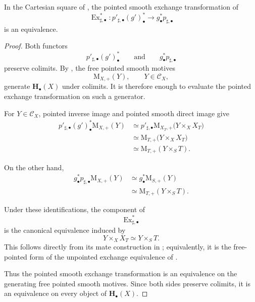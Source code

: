 \begin{theorem}
\label{thm:pointed-unstable-smooth-base-change}
In the Cartesian square of
, the pointed smooth exchange
transformation of
\[
    \operatorname{Ex}_{\sharp,\bullet}^{*}
    \colon
    p'_{\sharp,\bullet}(g')^*_\bullet
    \longrightarrow
    g^*_\bullet p_{\sharp,\bullet}
\]
is an equivalence.
\end{theorem}

\begin{proof}
Both functors
\[
    p'_{\sharp,\bullet}(g')^*_\bullet
    \qquad\text{and}\qquad
    g^*_\bullet p_{\sharp,\bullet}
\]
preserve colimits. By
, the free pointed smooth motives
\[
    \mathrm M_{X,+}(Y),
    \qquad
    Y\in\mathcal C_X,
\]
generate \(\mathbf H_\bullet(X)\) under colimits. It is therefore enough
to evaluate the pointed exchange transformation on such a generator.

For \(Y\in\mathcal C_X\), pointed inverse image and pointed smooth
direct image give
\[
\begin{aligned}
    p'_{\sharp,\bullet}(g')^*_\bullet
    \mathrm M_{X,+}(Y)
    &\simeq
    p'_{\sharp,\bullet}
    \mathrm M_{X_T,+}
    \bigl(
        Y\times_XX_T
    \bigr)
    \\
    &\simeq
    \mathrm M_{T,+}
    \bigl(
        Y\times_XX_T
    \bigr)
    \\
    &\simeq
    \mathrm M_{T,+}(Y\times_ST).
\end{aligned}
\]

On the other hand,
\[
\begin{aligned}
    g^*_\bullet p_{\sharp,\bullet}
    \mathrm M_{X,+}(Y)
    &\simeq
    g^*_\bullet
    \mathrm M_{S,+}(Y)
    \\
    &\simeq
    \mathrm M_{T,+}(Y\times_ST).
\end{aligned}
\]

Under these identifications, the component of
\[
    \operatorname{Ex}_{\sharp,\bullet}^{*}
\]
is the canonical equivalence induced by
\[
    Y\times_XX_T
    \simeq
    Y\times_ST.
\]
This follows directly from its mate construction in
; equivalently,
it is the free-pointed form of the unpointed exchange equivalence of
.

Thus the pointed smooth exchange transformation is an equivalence on
the generating free pointed smooth motives. Since both sides preserve
colimits, it is an equivalence on every object of
\(\mathbf H_\bullet(X)\).
\end{proof}


